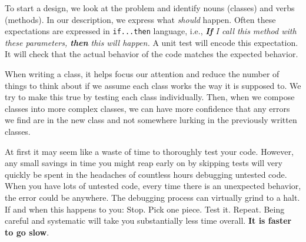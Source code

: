 To start a design, we look at the problem and identify nouns (classes) and verbs (methods).  In our description, we express what \emph{should} happen.  Often these expectations are expressed in \texttt{if...then} language, i.e., \emph{\textbf{If} I call this method with these parameters, \textbf{then} this will happen.} A unit test will encode this expectation.  It will check that the actual behavior of the code matches the expected behavior.


When writing a class, it helps focus our attention and reduce the number of things to think about if we assume each class works the way it is supposed to.  We try to make this true by testing each class individually.  Then, when we compose classes into more complex classes, we can have more confidence that any errors we find are in the new class and not somewhere lurking in the previously written classes.  


At first it may seem like a waste of time to thoroughly test your code.  However, any small savings in time you might reap early on by skipping tests will very quickly be spent in the headaches of countless hours debugging untested code.  When you have lots of untested code, every time there is an unexpected behavior, the error could be anywhere.  The debugging process can virtually grind to a halt.  If and when this happens to you: Stop. Pick one piece. Test it. Repeat.  Being careful and systematic will take you substantially less time overall. \textbf{It is faster to go slow}.
